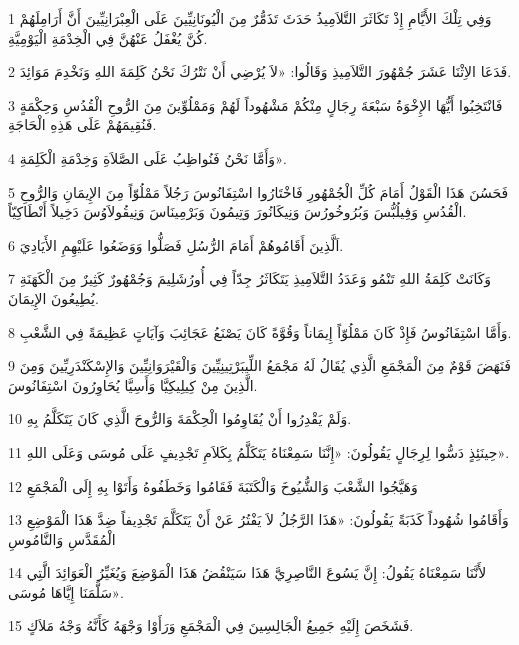 \par 1 وَفِي تِلْكَ الأَيَّامِ إِذْ تَكَاثَرَ التَّلاَمِيذُ حَدَثَ تَذَمُّرٌ مِنَ الْيُونَانِيِّينَ عَلَى الْعِبْرَانِيِّينَ أَنَّ أَرَامِلَهُمْ كُنَّ يُغْفَلُ عَنْهُنَّ فِي الْخِدْمَةِ الْيَوْمِيَّةِ.
\par 2 فَدَعَا الاِثْنَا عَشَرَ جُمْهُورَ التَّلاَمِيذِ وَقَالُوا: «لاَ يُرْضِي أَنْ نَتْرُكَ نَحْنُ كَلِمَةَ اللهِ وَنَخْدِمَ مَوَائِدَ.
\par 3 فَانْتَخِبُوا أَيُّهَا الإِخْوَةُ سَبْعَةَ رِجَالٍ مِنْكُمْ مَشْهُوداً لَهُمْ وَمَمْلُوِّينَ مِنَ الرُّوحِ الْقُدُسِ وَحِكْمَةٍ فَنُقِيمَهُمْ عَلَى هَذِهِ الْحَاجَةِ.
\par 4 وَأَمَّا نَحْنُ فَنُواظِبُ عَلَى الصَّلاَةِ وَخِدْمَةِ الْكَلِمَةِ».
\par 5 فَحَسُنَ هَذَا الْقَوْلُ أَمَامَ كُلِّ الْجُمْهُورِ فَاخْتَارُوا اسْتِفَانُوسَ رَجُلاً مَمْلُوّاً مِنَ الإِيمَانِ وَالرُّوحِ الْقُدُسِ وَفِيلُبُّسَ وَبُرُوخُورُسَ وَنِيكَانُورَ وَتِيمُونَ وَبَرْمِينَاسَ وَنِيقُولاَوُسَ دَخِيلاً أَنْطَاكِيّاً.
\par 6 اَلَّذِينَ أَقَامُوهُمْ أَمَامَ الرُّسُلِ فَصَلُّوا وَوَضَعُوا عَلَيْهِمِ الأَيَادِيَ.
\par 7 وَكَانَتْ كَلِمَةُ اللهِ تَنْمُو وَعَدَدُ التَّلاَمِيذِ يَتَكَاثَرُ جِدّاً فِي أُورُشَلِيمَ وَجُمْهُورٌ كَثِيرٌ مِنَ الْكَهَنَةِ يُطِيعُونَ الإِيمَانَ.
\par 8 وَأَمَّا اسْتِفَانُوسُ فَإِذْ كَانَ مَمْلُوّاً إِيمَاناً وَقُوَّةً كَانَ يَصْنَعُ عَجَائِبَ وَآيَاتٍ عَظِيمَةً فِي الشَّعْبِ.
\par 9 فَنَهَضَ قَوْمٌ مِنَ الْمَجْمَعِ الَّذِي يُقَالُ لَهُ مَجْمَعُ اللِّيبَرْتِينِيِّينَ وَالْقَيْرَوَانِيِّينَ وَالإِسْكَنْدَرِيِّينَ وَمِنَ الَّذِينَ مِنْ كِيلِيكِيَّا وَأَسِيَّا يُحَاوِرُونَ اسْتِفَانُوسَ.
\par 10 وَلَمْ يَقْدِرُوا أَنْ يُقَاوِمُوا الْحِكْمَةَ وَالرُّوحَ الَّذِي كَانَ يَتَكَلَّمُ بِهِ.
\par 11 حِينَئِذٍ دَسُّوا لِرِجَالٍ يَقُولُونَ: «إِنَّنَا سَمِعْنَاهُ يَتَكَلَّمُ بِكَلاَمِ تَجْدِيفٍ عَلَى مُوسَى وَعَلَى اللهِ».
\par 12 وَهَيَّجُوا الشَّعْبَ وَالشُّيُوخَ وَالْكَتَبَةَ فَقَامُوا وَخَطَفُوهُ وَأَتَوْا بِهِ إِلَى الْمَجْمَعِ
\par 13 وَأَقَامُوا شُهُوداً كَذَبَةً يَقُولُونَ: «هَذَا الرَّجُلُ لاَ يَفْتُرُ عَنْ أَنْ يَتَكَلَّمَ تَجْدِيفاً ضِدَّ هَذَا الْمَوْضِعِ الْمُقَدَّسِ وَالنَّامُوسِ
\par 14 لأَنَّنَا سَمِعْنَاهُ يَقُولُ: إِنَّ يَسُوعَ النَّاصِرِيَّ هَذَا سَيَنْقُضُ هَذَا الْمَوْضِعَ وَيُغَيِّرُ الْعَوَائِدَ الَّتِي سَلَّمَنَا إِيَّاهَا مُوسَى».
\par 15 فَشَخَصَ إِلَيْهِ جَمِيعُ الْجَالِسِينَ فِي الْمَجْمَعِ وَرَأَوْا وَجْهَهُ كَأَنَّهُ وَجْهُ مَلاَكٍ.

